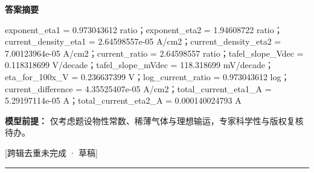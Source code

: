 \documentclass[UTF8,11pt,a4paper]{ctexart}
\begin{document}
\noindent\textbf{答案摘要}\par
exponent\_eta1 = 0.973043612 ratio；exponent\_eta2 = 1.94608722 ratio；current\_density\_eta1 = 2.64598557e-05 A/cm2；current\_density\_eta2 = 7.00123964e-05 A/cm2；current\_ratio = 2.64598557 ratio；tafel\_slope\_Vdec = 0.118318699 V/decade；tafel\_slope\_mVdec = 118.318699 mV/decade；eta\_for\_100x\_V = 0.236637399 V；log\_current\_ratio = 0.973043612 log；current\_difference = 4.35525407e-05 A/cm2；total\_current\_eta1\_A = 5.29197114e-05 A；total\_current\_eta2\_A = 0.000140024793 A\par
\noindent\textbf{模型前提：}
仅考虑题设物性常数、稀薄气体与理想输运，专家科学性与版权复核待办。\par
\noindent\textcolor{red!65!black}{[跨辑去重未完成 · 草稿]} \par
\medskip\hrule\medskip
{}
\end{document}
